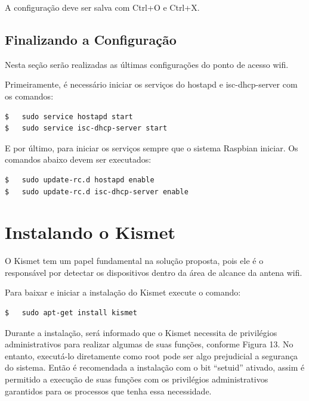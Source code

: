 A configuração deve ser salva com Ctrl+O e Ctrl+X.

\subsection{Finalizando a Configuração}
\label{sec:finalizando-configuracao}

Nesta seção serão realizadas as últimas configurações do ponto de acesso wifi.

Primeiramente, é necessário iniciar os serviços do hostapd e isc-dhcp-server com os comandos: \\

\begin{lstlisting}[language=bash]
$   sudo service hostapd start 
$   sudo service isc-dhcp-server start
\end{lstlisting}

E por último, para iniciar os serviços sempre que o sistema Raspbian iniciar. Os comandos abaixo devem ser executados: \\

\begin{lstlisting}[language=bash]
$   sudo update-rc.d hostapd enable 
$   sudo update-rc.d isc-dhcp-server enable
\end{lstlisting}

\section{Instalando o Kismet}
\label{sec:instalando-kismet}

O Kismet tem um papel fundamental na solução proposta, pois ele é o responsável por detectar os dispositivos dentro da área de alcance da antena wifi. 

Para baixar e iniciar a instalação do Kismet execute o comando: \\

\begin{lstlisting}[language=bash]
$   sudo apt-get install kismet
\end{lstlisting}

Durante a instalação, será informado que o Kismet necessita de privilégios administrativos para realizar algumas de suas funções, conforme Figura 13. No entanto, executá-lo diretamente como root pode ser algo prejudicial a segurança do sistema. Então é recomendada a instalação com o bit ``setuid'' ativado, assim é permitido a execução de suas funções com os privilégios administrativos garantidos para os processos que tenha essa necessidade.

